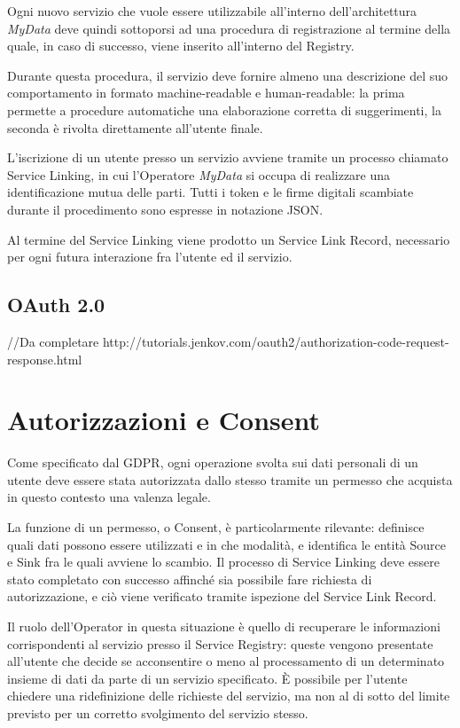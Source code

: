 Ogni nuovo servizio che vuole essere utilizzabile all’interno dell’architettura \textit{MyData} deve quindi sottoporsi ad una procedura di registrazione al termine della quale, in caso di successo, viene inserito all’interno del Registry.

Durante questa procedura, il servizio deve fornire almeno una descrizione del suo comportamento in formato machine-readable e human-readable: la prima permette a procedure automatiche una elaborazione corretta di suggerimenti, la seconda \`e rivolta direttamente all’utente finale.

L’iscrizione di un utente presso un servizio avviene tramite un processo chiamato Service Linking, in cui l’Operatore \textit{MyData} si occupa di realizzare una identificazione mutua delle parti. Tutti i token e le firme digitali scambiate durante il procedimento sono espresse in notazione JSON.

Al termine del Service Linking viene prodotto un Service Link Record, necessario per ogni futura interazione fra l’utente ed il servizio.

\subsection{OAuth 2.0}
//Da completare
\cite{oauth}
http://tutorials.jenkov.com/oauth2/authorization-code-request-response.html

\section{Autorizzazioni e Consent}
Come specificato dal GDPR, ogni operazione svolta sui dati personali di un utente deve essere stata autorizzata dallo stesso tramite un permesso che acquista in questo contesto una valenza legale.

La funzione di un permesso, o Consent, \`e particolarmente rilevante: definisce quali dati possono essere utilizzati e in che modalit\`a, e identifica le entit\`a Source e Sink fra le quali avviene lo scambio. Il processo di Service Linking deve essere stato completato con successo affinch\'e sia possibile fare richiesta di autorizzazione, e ci\`o viene verificato tramite ispezione del Service Link Record.

Il ruolo dell’Operator in questa situazione \`e quello di recuperare le informazioni corrispondenti al servizio presso il Service Registry: queste vengono presentate all’utente che decide se acconsentire o meno al processamento di un determinato insieme di dati da parte di un servizio specificato. È possibile per l’utente chiedere una ridefinizione delle richieste del servizio, ma non al di sotto del limite previsto per un corretto svolgimento del servizio stesso.

